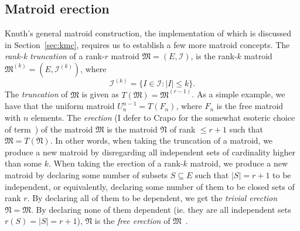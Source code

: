 \subsection{Matroid erection}
Knuth's general matroid construction, the implementation of which is discussed in Section~\ref{sec:kmc}, requires us to establish a few more matroid concepts. The \textit{rank-k truncation} of a rank-$r$ matroid $\mathfrak{M} = (E, \mathcal{I})$, is the rank-$k$ matroid $\mathfrak{M}^{(k)} = (E, \mathcal{I}^{(k)})$, where
$$\mathcal{I}^{(k)} = \{ I \in \mathcal{I} : |I| \leq k \}.$$
The \textit{truncation} of $\mathfrak{M}$ is given as $T(\mathfrak{M}) = \mathfrak{M}^{(r-1)}$. As a simple example, we have that the uniform matroid $U_n^{n-1} = T(F_n)$, where $F_n$ is the free matroid with $n$ elements. The \textit{erection} (I defer to Crapo for the somewhat esoteric choice of term~\cite{Crapo1970}) of the matroid $\mathfrak{M}$ is the matroid $\mathfrak{N}$ of rank $\leq r+1$ such that $\mathfrak{M} = T(\mathfrak{N})$. In other words, when taking the truncation of a matroid, we produce a new matroid by disregarding all independent sets of cardinality higher than some $k$. When taking the erection of a rank-$k$ matroid, we produce a new matroid by declaring some number of subsets $S \subseteq E$ such that $|S|=r+1$ to be independent, or equivalently, declaring some number of them to be closed sets of rank $r$. By declaring all of them to be dependent, we get the \textit{trivial erection} $\mathfrak{N} = \mathfrak{M}$. By declaring none of them dependent (ie. they are all independent sets $r(S) = |S| = r+1$), $\mathfrak{N}$ is the \textit{free erection} of $\mathfrak{M}$~\cite{greene-1991}.

